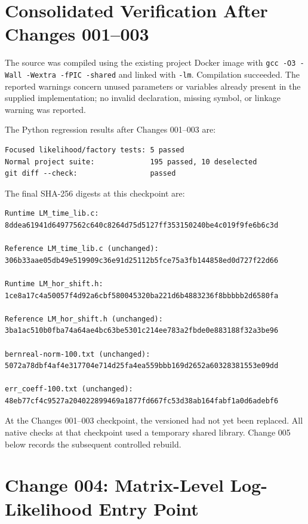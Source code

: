 \documentclass[11pt,a4paper]{article}
\begin{document}
\section{Consolidated Verification After Changes 001--003}

The source was compiled using the existing project Docker image with
\texttt{gcc -O3 -Wall -Wextra -fPIC -shared} and linked with
\texttt{-lm}. Compilation succeeded. The reported warnings concern unused
parameters or variables already present in the supplied implementation; no
invalid declaration, missing symbol, or linkage warning was reported.

The Python regression results after Changes 001--003 are:

\begin{verbatim}
Focused likelihood/factory tests: 5 passed
Normal project suite:             195 passed, 10 deselected
git diff --check:                 passed
\end{verbatim}

The final SHA-256 digests at this checkpoint are:

\begin{verbatim}
Runtime LM_time_lib.c:
8ddea61941d64977562c640c8264d75d5127ff353150240be4c019f9fe6b6c3d

Reference LM_time_lib.c (unchanged):
306b33aae05db49e519909c36e91d25112b5fce75a3fb144858ed0d727f22d66

Runtime LM_hor_shift.h:
1ce8a17c4a50057f4d92a6cbf580045320ba221d6b4883236f8bbbbb2d6580fa

Reference LM_hor_shift.h (unchanged):
3ba1ac510b0fba74a64ae4bc63be5301c214ee783a2fbde0e883188f32a3be96

bernreal-norm-100.txt (unchanged):
5072a78dbf4af4e317704e714d25fa4ea559bbb169d2652a60328381553e09dd

err_coeff-100.txt (unchanged):
48eb77cf4c9527a204022899469a1877fd667fc53d38ab164fabf1a0d6adebf6
\end{verbatim}

At the Changes 001--003 checkpoint, the versioned  had not
yet been replaced. All native checks at that checkpoint used a temporary shared
library. Change 005 below records the subsequent controlled rebuild.

\section{Change 004: Matrix-Level Log-Likelihood Entry Point}
\end{document}

